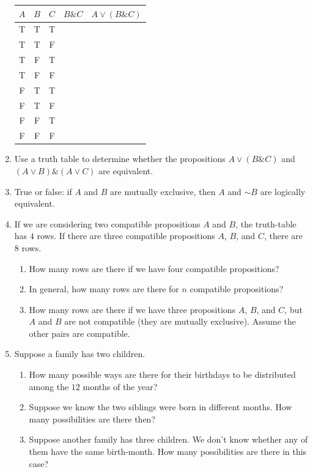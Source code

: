 \documentclass[justified]{tufte-book}
\providecommand{\tightlist}{%
  \setlength{\itemsep}{0pt}\setlength{\parskip}{0pt}}
\renewcommand{\neg}{\mathbin{\sim}}
\renewcommand{\wedge}{\mathbin{\&}}
\theoremstyle{definition}
\theoremstyle{definition}
\theoremstyle{definition}
\theoremstyle{definition}
\theoremstyle{remark}
\begin{document}
\begin{enumerate}
  \begin{longtable}[]{@{}ccccc@{}}
  \toprule
  \(A\) & \(B\) & \(C\) & \(B \wedge C\) & \(A \vee (B \wedge C)\) \\
  \midrule
  \endhead
  T & T & T & & \\
  T & T & F & & \\
  T & F & T & & \\
  T & F & F & & \\
  F & T & T & & \\
  F & T & F & & \\
  F & F & T & & \\
  F & F & F & & \\
  \bottomrule
  \end{longtable}
\item
  Use a truth table to determine whether the propositions \(A \vee (B \wedge C)\) and \((A \vee B) \wedge (A \vee C)\) are equivalent.
\item
  True or false: if \(A\) and \(B\) are mutually exclusive, then \(A\) and \(\neg B\) are logically equivalent.
\item
  If we are considering two compatible propositions \(A\) and \(B\), the truth-table has \(4\) rows. If there are three compatible propositions \(A\), \(B\), and \(C\), there are \(8\) rows.

  \begin{enumerate}
  \def\labelenumii{\alph{enumii}.}
  \tightlist
  \item
    How many rows are there if we have four compatible propositions?
  \item
    In general, how many rows are there for \(n\) compatible propositions?
  \item
    How many rows are there if we have three propositions \(A\), \(B\), and \(C\), but \(A\) and \(B\) are not compatible (they are mutually exclusive). Assume the other pairs are compatible.
  \end{enumerate}
\item
  Suppose a family has two children.

  \begin{enumerate}
  \def\labelenumii{\alph{enumii}.}
  \tightlist
  \item
    How many possible ways are there for their birthdays to be distributed among the \(12\) months of the year?
  \item
    Suppose we know the two siblings were born in different months. How many possibilities are there then?
  \item
    Suppose another family has three children. We don't know whether any of them have the same birth-month. How many possibilities are there in this case?
  \end{enumerate}
\end{enumerate}
\end{document}
